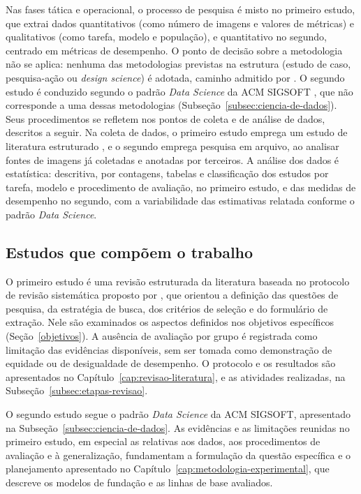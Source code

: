 Nas fases tática e operacional, o processo de pesquisa é misto no primeiro
estudo, que extrai dados quantitativos (como número de imagens e valores de
métricas) e qualitativos (como tarefa, modelo e população), e quantitativo no
segundo, centrado em métricas de desempenho. O ponto de decisão sobre a
metodologia não se aplica: nenhuma das metodologias previstas na estrutura
(estudo de caso, pesquisa-ação ou \textit{design science}) é adotada, caminho
admitido por . O segundo estudo é conduzido segundo o
padrão \textit{Data Science} da ACM SIGSOFT \cite{acmSigsoftDataScience}, que
não corresponde a uma dessas metodologias (Subseção~\ref{subsec:ciencia-de-dados}). Seus
procedimentos se refletem nos pontos de coleta e de análise de dados, descritos
a seguir. Na coleta de dados, o primeiro estudo emprega um estudo de
literatura estruturado \cite{kitchenham2007}, e o segundo emprega pesquisa em arquivo, ao analisar
fontes de imagens já coletadas e anotadas por terceiros. A análise dos dados
é estatística: descritiva, por contagens, tabelas e classificação dos estudos
por tarefa, modelo e procedimento de avaliação, no primeiro estudo, e das
medidas de desempenho no segundo, com a variabilidade das estimativas relatada
conforme o padrão \textit{Data Science}.

\subsection{Estudos que compõem o trabalho}

O primeiro estudo é uma revisão estruturada da literatura baseada no protocolo
de revisão sistemática proposto por , que orientou a
definição das questões de pesquisa, da estratégia de busca, dos critérios de
seleção e do formulário de extração. Nele são examinados os aspectos definidos
nos objetivos específicos (Seção~\ref{objetivos}). A ausência de avaliação por
grupo é registrada como limitação das evidências disponíveis, sem ser tomada
como demonstração de equidade ou de desigualdade de desempenho. O protocolo e
os resultados são apresentados no Capítulo~\ref{cap:revisao-literatura}, e as
atividades realizadas, na Subseção~\ref{subsec:etapas-revisao}.

O segundo estudo segue o padrão \textit{Data Science} da ACM SIGSOFT,
apresentado na Subseção~\ref{subsec:ciencia-de-dados}. As evidências e as
limitações reunidas no primeiro estudo, em especial as relativas aos dados, aos
procedimentos de avaliação e à generalização, fundamentam a formulação da
questão específica e o planejamento apresentado no
Capítulo~\ref{cap:metodologia-experimental}, que descreve os modelos de
fundação e as linhas de base avaliados.

